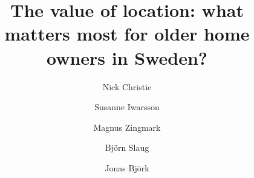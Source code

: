 \documentclass[3p,12pt ]{elsarticle}
\begin{document}
\begin{frontmatter}



\title{The value of location: what matters most for older home owners in Sweden?}


\author[1]{Nick Christie}

\author[1]{Susanne Iwarsson}

\author[1]{Magnus Zingmark}


\author[1]{Bj\"orn Slaug}

\author[2]{Jonas Bj\"ork}



















\end{frontmatter}
\end{document}
